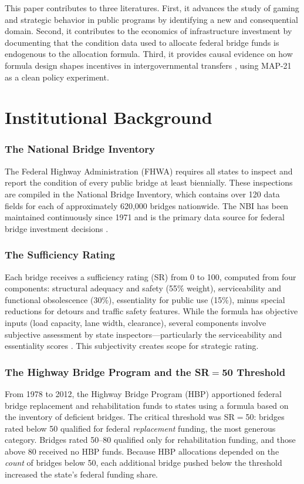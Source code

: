 \documentclass[12pt]{article}
\begin{document}
This paper contributes to three literatures. First, it advances the study of gaming and strategic behavior in public programs \citep{jacob2003rotten, figlio2006testing, litschig2012intergovernmental} by identifying a new and consequential domain. Second, it contributes to the economics of infrastructure investment \citep{fisman2017corruption, asce2021infrastructure} by documenting that the condition data used to allocate federal bridge funds is endogenous to the allocation formula. Third, it provides causal evidence on how formula design shapes incentives in intergovernmental transfers \citep{oates1999essay, gordon2004intergovernmental, albouy2012evaluating}, using MAP-21 as a clean policy experiment.


\section{Institutional Background}

\subsubsection*{The National Bridge Inventory} The Federal Highway Administration (FHWA) requires all states to inspect and report the condition of every public bridge at least biennially. These inspections are compiled in the National Bridge Inventory, which contains over 120 data fields for each of approximately 620,000 bridges nationwide. The NBI has been maintained continuously since 1971 and is the primary data source for federal bridge investment decisions \citep{strathman1991bridge}.

\subsubsection*{The Sufficiency Rating} Each bridge receives a sufficiency rating (SR) from 0 to 100, computed from four components: structural adequacy and safety (55\% weight), serviceability and functional obsolescence (30\%), essentiality for public use (15\%), minus special reductions for detours and traffic safety features. While the formula has objective inputs (load capacity, lane width, clearance), several components involve subjective assessment by state inspectors---particularly the serviceability and essentiality scores \citep{ward2009bridge}. This subjectivity creates scope for strategic rating.

\subsubsection*{The Highway Bridge Program and the SR$=$50 Threshold} From 1978 to 2012, the Highway Bridge Program (HBP) apportioned federal bridge replacement and rehabilitation funds to states using a formula based on the inventory of deficient bridges. The critical threshold was SR$=$50: bridges rated below 50 qualified for federal \textit{replacement} funding, the most generous category. Bridges rated 50--80 qualified only for rehabilitation funding, and those above 80 received no HBP funds. Because HBP allocations depended on the \textit{count} of bridges below 50, each additional bridge pushed below the threshold increased the state's federal funding share.
\end{document}

